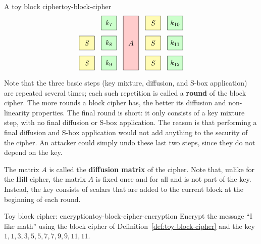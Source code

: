 \begin{definition}{A toy block cipher}{toy-block-cipher}
\begin{equation*}
\begin{tikzpicture}[xscale=1.1,
      a/.style={fill=red!20},
      s/.style={fill=yellow!30},
      k/.style={fill=green!20}]
      \draw[s] (6,1) +(-0.35,-0.35) rectangle node{$S$} +(0.35,0.35);
      \draw[s] (6,0) +(-0.35,-0.35) rectangle node{$S$} +(0.35,0.35);
      \draw[k] (7,2) +(-0.35,-0.35) rectangle node{$k_{7}$} +(0.35,0.35);
      \draw[k] (7,1) +(-0.35,-0.35) rectangle node{$k_{8}$} +(0.35,0.35);
      \draw[k] (7,0) +(-0.35,-0.35) rectangle node{$k_{9}$} +(0.35,0.35);
      \draw[a] (8,0) +(-0.35,-0.35) rectangle node{$A$} +(0.35,2.35);
      \draw[s] (9,2) +(-0.35,-0.35) rectangle node{$S$} +(0.35,0.35);
      \draw[s] (9,1) +(-0.35,-0.35) rectangle node{$S$} +(0.35,0.35);
      \draw[s] (9,0) +(-0.35,-0.35) rectangle node{$S$} +(0.35,0.35);
      \draw[k] (10,2) +(-0.35,-0.35) rectangle node{$k_{10}$} +(0.35,0.35);
      \draw[k] (10,1) +(-0.35,-0.35) rectangle node{$k_{11}$} +(0.35,0.35);
      \draw[k] (10,0) +(-0.35,-0.35) rectangle node{$k_{12}$} +(0.35,0.35);
  \end{tikzpicture}
\end{equation*}
\end{definition}

Note that the three basic steps (key mixture, diffusion, and S-box
application) are repeated several times; each such repetition is
called a \textbf{round}%
 of the block cipher.  The more rounds a
block cipher has, the better its diffusion and non-linearity
properties. The final round is short: it only consists of a key
mixture step, with no final diffusion or S-box application. The reason
is that performing a final diffusion and S-box application would not
add anything to the security of the cipher. An attacker could simply
undo these last two steps, since they do not depend on the key.

The matrix $A$ is called the \textbf{diffusion matrix}%
%
 of the cipher. Note that, unlike for
the Hill cipher, the matrix $A$ is fixed once and for all and is not
part of the key. Instead, the key consists of scalars that are added
to the current block at the beginning of each round.

\begin{example}{Toy block cipher: encryption}{toy-block-cipher-encryption}
  Encrypt the message ``I like math'' using the block cipher of
  Definition~\ref{def:toy-block-cipher} and the key
  $1,1,3,3,5,5,7,7,9,9,11,11$.
\end{example}


